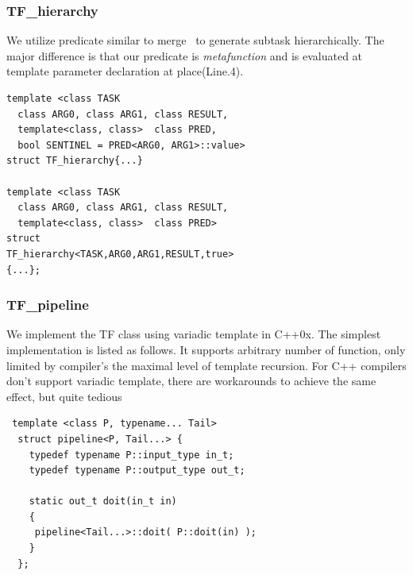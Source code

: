 \subsubsection{TF\_hierarchy}
We utilize predicate similar to merge~\cite{merge} to generate subtask
hierarchically. The major difference is that our predicate is
\textit{metafunction} and is evaluated at template parameter
declaration at place(Line.4).

\resetlinenumber[1]
\linenumbers
\begin{verbatim}
template <class TASK
  class ARG0, class ARG1, class RESULT,
  template<class, class>  class PRED,
  bool SENTINEL = PRED<ARG0, ARG1>::value>
struct TF_hierarchy{...}

template <class TASK
  class ARG0, class ARG1, class RESULT,
  template<class, class>  class PRED>
struct 
TF_hierarchy<TASK,ARG0,ARG1,RESULT,true>
{...};
\end{verbatim}
\nolinenumbers

\subsubsection{TF\_pipeline}
We implement the TF class using variadic template in C++0x. The
simplest implementation is listed as follows. It supports arbitrary
number of function, only limited by compiler's the maximal level of template
recursion.  For C++ compilers don't support variadic template, there
are workarounds to achieve the same effect, but quite tedious

\resetlinenumber[1]
\linenumbers
\begin{verbatim}
 template <class P, typename... Tail>
  struct pipeline<P, Tail...> {
    typedef typename P::input_type in_t;
    typedef typename P::output_type out_t;
   
    static out_t doit(in_t in)
    {
     pipeline<Tail...>::doit( P::doit(in) );
    }
  };  
\end{verbatim}
\nolinenumbers
